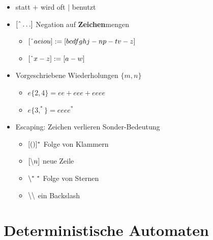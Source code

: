 \documentclass{scrartcl}
\begin{document}
\begin{itemize}
	\item statt $+$ wird oft $\mid$ benutzt
	\item $[\string^ \ldots]$ Negation auf \textbf{Zeichen}mengen
	\begin{itemize}
		\item $[\string^ aeiou] := [bcdfghj-np-tv-z]$
		\item $[\string^ x-z] := [a-w]$
	\end{itemize}
	\item Vorgeschriebene Wiederholungen $\{ m,n \}$
	\begin{itemize}
		\item $e\{ 2,4 \} = ee + eee + eeee$
		\item $e\{ 3,^* \} = eeee^*$
	\end{itemize}
	\item Escaping: Zeichen verlieren Sonder-Bedeutung
	\begin{itemize}
		\item $[()]^* \hfill$ Folge von Klammern
		\item $[\backslash n] \hfill$ neue Zeile
		\item $\backslash ^* \; ^* \hfill$ Folge von Sternen
		\item $\backslash \backslash \hfill$ ein Backslash
	\end{itemize}
\end{itemize}

\pagebreak
\section{Deterministische Automaten}
\end{document}
